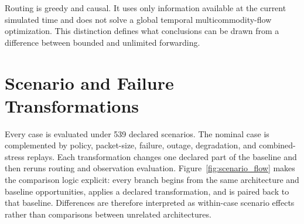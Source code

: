 Routing is greedy and causal. It uses only information available at the current simulated time and does not solve a global temporal multicommodity-flow optimization. This distinction defines what conclusions can be drawn from a difference between bounded and unlimited forwarding.

\section{Scenario and Failure Transformations}
Every case is evaluated under 539 declared scenarios. The nominal case is complemented by policy, packet-size, failure, outage, degradation, and combined-stress replays. Each transformation changes one declared part of the baseline and then reruns routing and observation evaluation. Figure~\ref{fig:scenario_flow} makes the comparison logic explicit: every branch begins from the same architecture and baseline opportunities, applies a declared transformation, and is paired back to that baseline. Differences are therefore interpreted as within-case scenario effects rather than comparisons between unrelated architectures.

